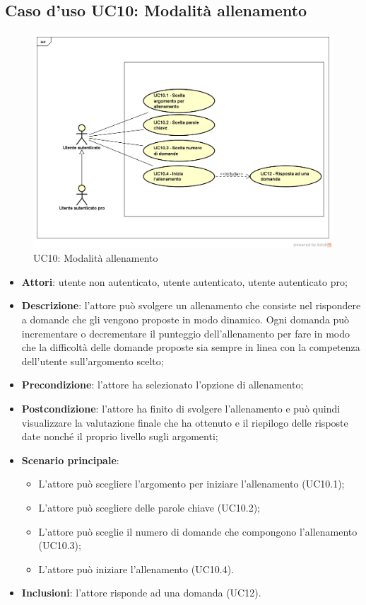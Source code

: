\newpage
\subsection{Caso d'uso UC10: Modalità allenamento}
\label{UC10}
	\begin{figure}
	\centering
	\includegraphics[scale=0.5]{UML/UC10.png}
	\caption{UC10: Modalità allenamento}
	\end{figure}
\FloatBarrier
\begin{itemize}
\item\textbf{Attori}: utente non autenticato, utente autenticato, utente autenticato pro;
\item\textbf{Descrizione}: l'attore può svolgere un allenamento che consiste nel rispondere a domande che gli vengono proposte in modo dinamico. Ogni domanda può incrementare o decrementare il punteggio dell'allenamento per fare in modo che la difficoltà delle domande proposte sia sempre in linea con la competenza dell'utente sull'argomento scelto;
\item\textbf{Precondizione}: l'attore ha selezionato l'opzione di allenamento;
\item\textbf{Postcondizione}: l'attore ha finito di svolgere l'allenamento e può quindi visualizzare la valutazione finale che ha ottenuto e il riepilogo delle risposte date nonché il proprio livello sugli argomenti;
\item\textbf{Scenario principale}:
	\begin{itemize}
		\item L'attore può scegliere l'argomento per iniziare l'allenamento (UC10.1);
		\item L'attore può scegliere delle parole chiave (UC10.2);
		\item L'attore può sceglie il numero di domande che compongono l'allenamento (UC10.3);
		\item L'attore può iniziare l'allenamento (UC10.4).
	\end{itemize}
\item \textbf{Inclusioni}: l'attore risponde ad una domanda (UC12).
\end{itemize}

